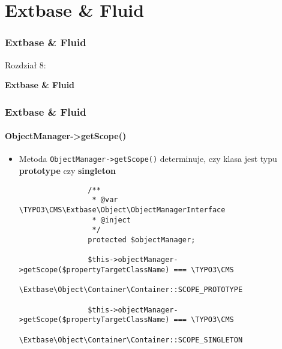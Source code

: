 %
\section{Extbase \& Fluid}
\begin{frame}[fragile]
	\frametitle{Extbase \& Fluid}

	\begin{center}\huge{Rozdział 8:}\end{center}
	\begin{center}\huge{\color{typo3darkgrey}\textbf{Extbase \& Fluid}}\end{center}

\end{frame}


\begin{frame}[fragile]
	\frametitle{Extbase \& Fluid}
	\framesubtitle{ObjectManager->getScope()}

	\lstset{
		basicstyle=\tiny\ttfamily
	}

	\begin{itemize}
		\item Metoda \texttt{ObjectManager->getScope()} determinuje,\newline
			czy klasa jest typu \textbf{prototype} czy \textbf{singleton}

			\begin{lstlisting}
				/**
				 * @var \TYPO3\CMS\Extbase\Object\ObjectManagerInterface
				 * @inject
				 */
				protected $objectManager;

				$this->objectManager->getScope($propertyTargetClassName) === \TYPO3\CMS
				\Extbase\Object\Container\Container::SCOPE_PROTOTYPE

				$this->objectManager->getScope($propertyTargetClassName) === \TYPO3\CMS
				\Extbase\Object\Container\Container::SCOPE_SINGLETON
			\end{lstlisting}

	\end{itemize}

\end{frame}

